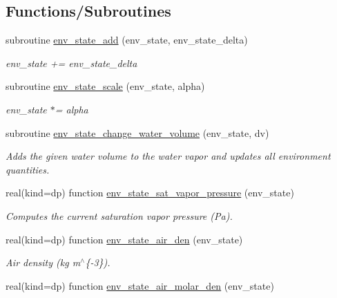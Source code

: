 \subsection*{Functions/\+Subroutines}
\begin{DoxyCompactItemize}
\item 
subroutine \mbox{\hyperlink{namespacepmc__env__state_a8a28c313cebdbb76a6bf2fb278a8addf}{env\+\_\+state\+\_\+add}} (env\+\_\+state, env\+\_\+state\+\_\+delta)
\begin{DoxyCompactList}\small\item\em env\+\_\+state += env\+\_\+state\+\_\+delta \end{DoxyCompactList}\item 
subroutine \mbox{\hyperlink{namespacepmc__env__state_a2fe48038c4d8f58d369fb68e2e94ed49}{env\+\_\+state\+\_\+scale}} (env\+\_\+state, alpha)
\begin{DoxyCompactList}\small\item\em env\+\_\+state $\ast$= alpha \end{DoxyCompactList}\item 
subroutine \mbox{\hyperlink{namespacepmc__env__state_a961f64db61820e148e7a85f93755180b}{env\+\_\+state\+\_\+change\+\_\+water\+\_\+volume}} (env\+\_\+state, dv)
\begin{DoxyCompactList}\small\item\em Adds the given water volume to the water vapor and updates all environment quantities. \end{DoxyCompactList}\item 
real(kind=dp) function \mbox{\hyperlink{namespacepmc__env__state_abc5a1b93ea4a56a1b20c4fc3177b2ab4}{env\+\_\+state\+\_\+sat\+\_\+vapor\+\_\+pressure}} (env\+\_\+state)
\begin{DoxyCompactList}\small\item\em Computes the current saturation vapor pressure (Pa). \end{DoxyCompactList}\item 
real(kind=dp) function \mbox{\hyperlink{namespacepmc__env__state_a9ff224fb49c16b4bfe0ae896d9c278f2}{env\+\_\+state\+\_\+air\+\_\+den}} (env\+\_\+state)
\begin{DoxyCompactList}\small\item\em Air density (kg m$^\wedge$\{-\/3\}). \end{DoxyCompactList}\item 
real(kind=dp) function \mbox{\hyperlink{namespacepmc__env__state_a71d24aa32a9f0f3cbb919654fc588039}{env\+\_\+state\+\_\+air\+\_\+molar\+\_\+den}} (env\+\_\+state)

\end{DoxyCompactItemize}

